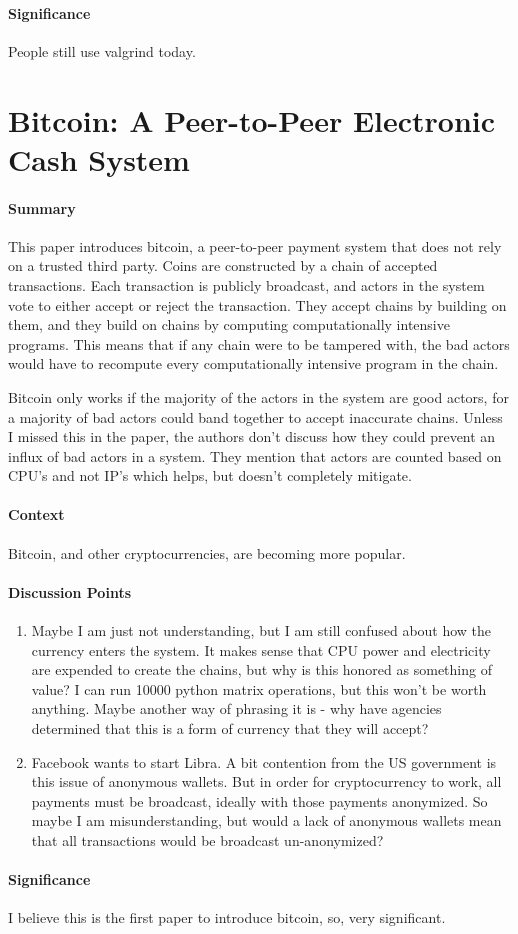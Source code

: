 \paragraph{\textbf{Significance}}
People still use valgrind today.

\section {Bitcoin: A Peer-to-Peer Electronic Cash System \cite{nakamoto2008bitcoin}}

\paragraph{\textbf{Summary}}
This paper introduces bitcoin, a peer-to-peer payment system that does not rely
on a trusted third party. Coins are constructed by a chain of accepted
transactions. Each transaction is publicly broadcast, and actors in the system
vote to either accept or reject the transaction. They accept chains by building
on them, and they build on chains by computing computationally intensive
programs. This means that if any chain were to be tampered with, the bad actors
would have to recompute every computationally intensive program in the chain.

Bitcoin only works if the majority of the actors in the system are good actors,
for a majority of bad actors could band together to accept inaccurate chains.
Unless I missed this in the paper, the authors don't discuss how they could
prevent an influx of bad actors in a system. They mention that actors are
counted based on CPU's and not IP's which helps, but doesn't completely
mitigate.

\paragraph{\textbf{Context}}
Bitcoin, and other cryptocurrencies, are becoming more popular.

\paragraph{\textbf{Discussion Points}}
\begin{enumerate}
    \item Maybe I am just not understanding, but I am still confused about how
    the currency enters the system. It makes sense that CPU power and
    electricity are expended to create the chains, but why is this honored as
    something of value? I can run 10000 python matrix operations, but this won't
    be worth anything. Maybe another way of phrasing it is - why have agencies
    determined that this is a form of currency that they will accept?
    \item Facebook wants to start Libra. A bit contention from the US government
    is this issue of anonymous wallets. But in order for cryptocurrency to work,
    all payments must be broadcast, ideally with those payments anonymized. So
    maybe I am misunderstanding, but would a lack of anonymous wallets mean that
    all transactions would be broadcast un-anonymized?
\end{enumerate}

\paragraph{\textbf{Significance}}
I believe this is the first paper to introduce bitcoin, so, very significant.